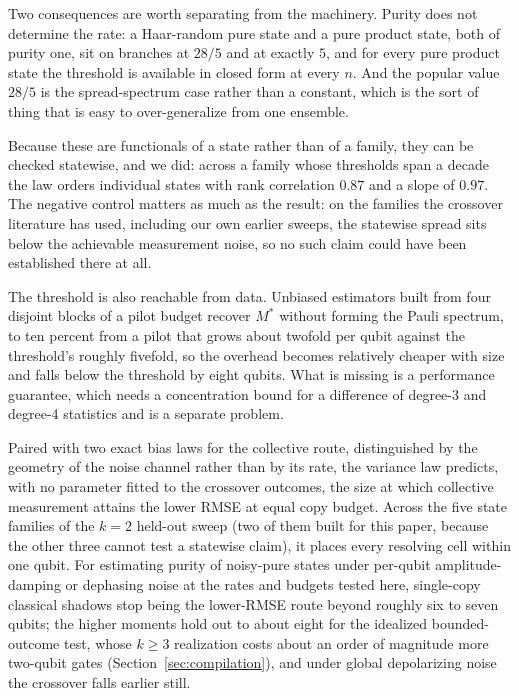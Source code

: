 \documentclass[a4paper,superscriptaddress,nofootinbib,onecolumn,nopdfoutputerror]{quantumarticle}
\begin{document}
Two consequences are worth separating from the machinery. Purity does not determine the rate: a
Haar-random pure state and a pure product state, both of purity one, sit on branches at \(28/5\)
and at exactly \(5\), and for every pure product state the threshold is available in closed form
at every \(n\). And the popular value \(28/5\) is the spread-spectrum case rather than a constant,
which is the sort of thing that is easy to over-generalize from one ensemble.

Because these are functionals of a state rather than of a family, they can be checked statewise,
and we did: across a family whose thresholds span a decade the law orders individual states with
rank correlation \(0.87\) and a slope of \(0.97\). The negative control matters as much as the result: on the families the
crossover literature has used, including our own earlier sweeps, the statewise
spread sits below the achievable measurement noise, so no such claim could have
been established there at all.

The threshold is also reachable from data. Unbiased estimators built from four disjoint blocks of
a pilot budget recover \(M^*\) without forming the Pauli spectrum, to ten percent from a pilot
that grows about twofold per qubit against the threshold's roughly fivefold, so the overhead
becomes relatively cheaper with size and falls below the threshold by eight qubits. What is
missing is a performance guarantee, which needs a concentration bound for a difference of degree-3 and degree-4 statistics and is a
separate problem.

Paired with two exact bias laws for the collective route, distinguished by the geometry of the
noise channel rather than by its rate, the variance law predicts, with no parameter fitted to the
crossover outcomes, the size at which collective measurement attains the lower RMSE at equal copy
budget. Across the five state families of the \(k = 2\) held-out sweep (two of them built for this
paper, because the other three cannot test a statewise claim), it places every resolving cell
within one qubit. For estimating
purity of noisy-pure states under per-qubit amplitude-damping or dephasing noise at the rates and
budgets tested here, single-copy classical shadows stop being the lower-RMSE route beyond roughly
six to seven qubits; the higher moments hold out to about eight for the idealized bounded-outcome
test, whose \(k \ge 3\) realization costs about an order of magnitude more two-qubit gates
(Section~\ref{sec:compilation}), and under global depolarizing noise the crossover falls earlier
still.
\end{document}
